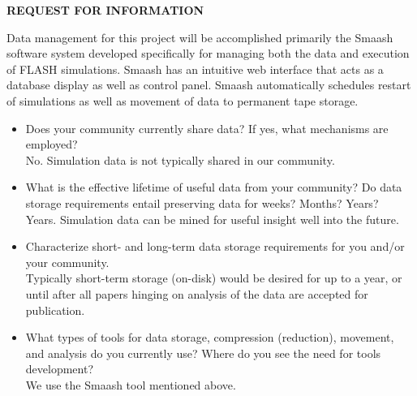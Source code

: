 \documentclass[12pt,letterpaper,english]{article}
\begin{document}
\setlength{\parindent}{0in} %


\pagestyle{fancy} \lhead{\doctitle}  \renewcommand{%
\headrulewidth}{0.0pt}

\begin{center}
\bf \large {REQUEST FOR INFORMATION} \\
\end{center}

\vspace{-.25in}

Data management for this project will be accomplished primarily the
Smaash software system developed specifically for managing both the
data and execution of FLASH simulations.  Smaash has an intuitive web
interface that acts as a database display as well as control panel.
Smaash automatically schedules restart of simulations as well as
movement of data to permanent tape storage.

\vspace{-.15in}
\begin{itemize}

\item Does your community currently share data? If yes, what
  mechanisms are employed? \\
No.  Simulation data is not typically shared in our community.\\
\item What is the effective lifetime of useful data from your
  community? Do data storage requirements entail preserving data for
  weeks? Months? Years? \\
Years.  Simulation data can be mined for useful insight well into the future.\\
\item Characterize short- and long-term data storage requirements for
  you and/or your community.\\
Typically short-term storage (on-disk) would be desired for up to a
year, or until after all papers hinging on analysis of the data are
accepted for publication.  \\
\item What types of tools for data storage, compression (reduction),
  movement, and analysis do you currently use? Where do you see the
  need for tools development?\\
We use the Smaash tool mentioned above.
\end{itemize}
\vspace{-.15in}
\end{document}
